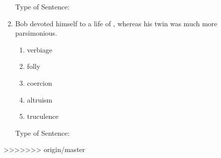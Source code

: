 \begin{enumerate}
Type of Sentence:\hrulefill

\bigskip
\item Bob devoted himself to a life of \longline, whereas his twin was much more parsimonious. 
\begin{enumerate}[label=(\Alph*)]
\item verbiage
\item folly
\item coercion
\item altruism 
\item truculence
\end{enumerate}

Type of Sentence:\hrulefill

\end{enumerate}





>>>>>>> origin/master
